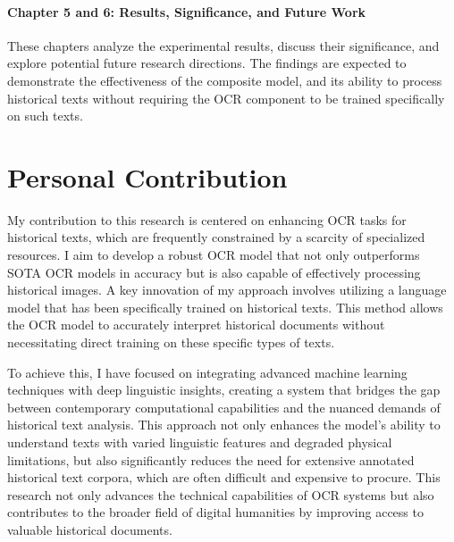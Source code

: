 \paragraph*{Chapter 5 and 6: Results, Significance, and Future Work}
These chapters analyze the experimental results, discuss their significance, and explore potential future research directions. The findings are expected to demonstrate the effectiveness of the composite model, and its ability to process historical texts without requiring the OCR component to be trained specifically on such texts.

\section{Personal Contribution}
\label{sec:1_personal_contribution}
My contribution to this research is centered on enhancing OCR tasks for historical texts, which are frequently constrained by a scarcity of specialized resources. I aim to develop a robust OCR model that not only outperforms SOTA OCR models in accuracy but is also capable of effectively processing historical images. A key innovation of my approach involves utilizing a language model that has been specifically trained on historical texts. This method allows the OCR model to accurately interpret historical documents without necessitating direct training on these specific types of texts.

To achieve this, I have focused on integrating advanced machine learning techniques with deep linguistic insights, creating a system that bridges the gap between contemporary computational capabilities and the nuanced demands of historical text analysis. This approach not only enhances the model's ability to understand texts with varied linguistic features and degraded physical limitations, but also significantly reduces the need for extensive annotated historical text corpora, which are often difficult and expensive to procure. This research not only advances the technical capabilities of OCR systems but also contributes to the broader field of digital humanities by improving access to valuable historical documents. 
